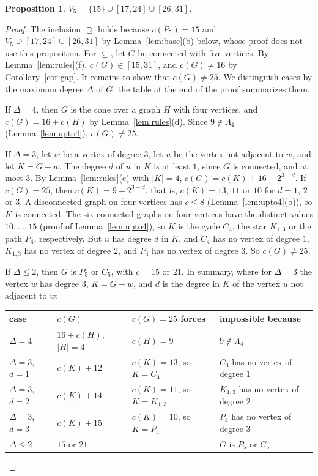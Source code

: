 \documentclass[11pt]{amsart}
\newtheorem{proposition}[theorem]{Proposition}
\theoremstyle{definition}
\theoremstyle{remark}
\newcommand{\Lam}{\Lambda}
\begin{document}
\begin{proposition}\label{prop:V5}
$V_5=\{15\}\cup[17,24]\cup[26,31]$.
\end{proposition}

\begin{proof}
The inclusion $\supseteq$ holds because $c(P_5)=15$ and $V_5\supseteq[17,24]\cup[26,31]$ by Lemma~\ref{lem:base}(b) below, whose proof does not use this proposition. For $\subseteq$, let $G$ be connected with five vertices. By Lemma~\ref{lem:rules}(f), $c(G)\in[15,31]$, and $c(G)\ne16$ by Corollary~\ref{cor:gap}. It remains to show that $c(G)\ne25$. We distinguish cases by the maximum degree $\Delta$ of $G$; the table at the end of the proof summarizes them.

If $\Delta=4$, then $G$ is the cone over a graph $H$ with four vertices, and $c(G)=16+c(H)$ by Lemma~\ref{lem:rules}(d). Since $9\notin\Lam_4$ (Lemma~\ref{lem:upto4}), $c(G)\ne25$.

If $\Delta=3$, let $w$ be a vertex of degree $3$, let $u$ be the vertex not adjacent to $w$, and let $K=G-w$. The degree $d$ of $u$ in $K$ is at least $1$, since $G$ is connected, and at most $3$. By Lemma~\ref{lem:rules}(e) with $|K|=4$, $c(G)=c(K)+16-2^{3-d}$. If $c(G)=25$, then $c(K)=9+2^{3-d}$, that is, $c(K)=13$, $11$ or $10$ for $d=1$, $2$ or $3$. A disconnected graph on four vertices has $c\le8$ (Lemma~\ref{lem:upto4}(b)), so $K$ is connected. The six connected graphs on four vertices have the distinct values $10,\dots,15$ (proof of Lemma~\ref{lem:upto4}), so $K$ is the cycle $C_4$, the star $K_{1,3}$ or the path $P_4$, respectively. But $u$ has degree $d$ in $K$, and $C_4$ has no vertex of degree $1$, $K_{1,3}$ has no vertex of degree $2$, and $P_4$ has no vertex of degree $3$. So $c(G)\ne25$.

If $\Delta\le2$, then $G$ is $P_5$ or $C_5$, with $c=15$ or $21$. In summary, where for $\Delta=3$ the vertex $w$ has degree $3$, $K=G-w$, and $d$ is the degree in $K$ of the vertex $u$ not adjacent to $w$:
\begin{center}
\small
\begin{tabular}{llll}
\toprule
case & $c(G)$ & $c(G)=25$ forces & impossible because\\
\midrule
$\Delta=4$ & $16+c(H)$, $|H|=4$ & $c(H)=9$ & $9\notin\Lam_4$\\
$\Delta=3$, $d=1$ & $c(K)+12$ & $c(K)=13$, so $K=C_4$ & $C_4$ has no vertex of degree $1$\\
$\Delta=3$, $d=2$ & $c(K)+14$ & $c(K)=11$, so $K=K_{1,3}$ & $K_{1,3}$ has no vertex of degree $2$\\
$\Delta=3$, $d=3$ & $c(K)+15$ & $c(K)=10$, so $K=P_4$ & $P_4$ has no vertex of degree $3$\\
$\Delta\le2$ & $15$ or $21$ & --- & $G$ is $P_5$ or $C_5$\\
\bottomrule
\end{tabular}
\end{center}
\end{proof}
\end{document}
